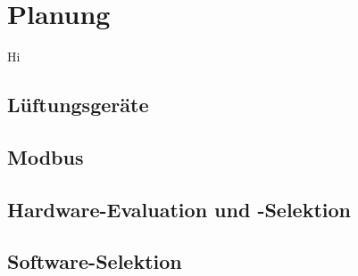 \chapter{Planung}

Hi

\section{Lüftungsgeräte}


\section{Modbus}


\section{Hardware-Evaluation und -Selektion}

\section{Software-Selektion}

